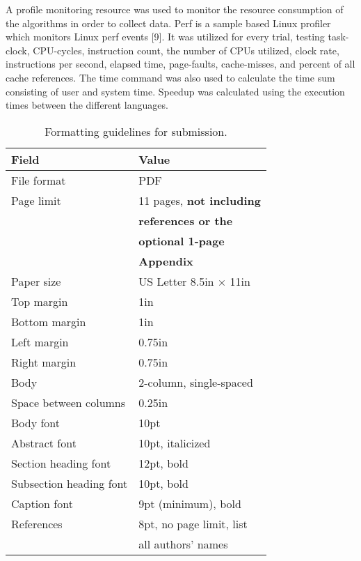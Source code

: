 \documentclass{sig-alternate}
\begin{document}
A profile monitoring resource was used to monitor the resource consumption of the algorithms in order to collect data. Perf is a sample based Linux profiler which monitors Linux perf events [9]. It was utilized for every trial, testing task-clock, CPU-cycles, instruction count, the number of CPUs utilized, clock rate, instructions per second, elapsed time, page-faults, cache-misses, and percent of all cache references. The time command was also used to calculate the time sum consisting of user and system time. Speedup was calculated using the execution times between the different languages.

\begin{scriptsize}
\begin{table}[h!]
  \centering
  \begin{tabular}{|l|l|}
    \hline
    \textbf{Field} & \textbf{Value}\\
    \hline
    \hline
    File format & PDF \\
    \hline
    Page limit & 11 pages, {\bf not including}\\
               & {\bf references or the}\\
               & {\bf optional 1-page }\\
               & {\bf Appendix}\\
    \hline
    Paper size & US Letter 8.5in $\times$ 11in\\
    \hline
    Top margin & 1in\\
    \hline
    Bottom margin & 1in\\
    \hline
    Left margin & 0.75in\\
    \hline
    Right margin & 0.75in\\
    \hline
    Body & 2-column, single-spaced\\
    \hline
    Space between columns & 0.25in\\
    \hline
    Body font & 10pt\\
    \hline
    Abstract font & 10pt, italicized\\
    \hline
    Section heading font & 12pt, bold\\
    \hline
    Subsection heading font & 10pt, bold\\
    \hline
    Caption font & 9pt (minimum), bold\\
    \hline
    References & 8pt, no page limit, list \\
               & all authors' names\\
    \hline
  \end{tabular}
  \caption{Formatting guidelines for submission. }
  \label{table:formatting}
\end{table}
\end{scriptsize}
\end{document}
